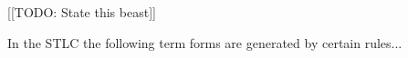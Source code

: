 [[TODO: State this beast]]
\begin{lemma}
    In the STLC the following term forms are generated by certain rules...
\end{lemma}




\begin{comment}


\subsection{Judgements}
Our judgements:
\begin{center}
    \begin{tabular}{c | c}
        $\Gamma\ \mathrm{ctx}$ &  $\Gamma$ is a well-formed context. \\
        $\Gamma \vdash A\ \mathrm{Type}$ & $A$ is a type in context $\Gamma$. \\
        $\Gamma \vdash x : A$ & $x$ is a term of type $A$ in context $\Gamma$. \\
    \end{tabular}
\end{center}



\end{comment}
